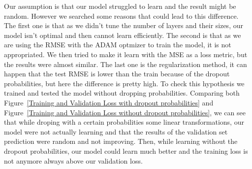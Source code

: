 \documentclass[12pt]{article}
\begin{document}
\noindent Our assumption is that our model struggled to learn and the result might be random. However we searched some reasons that could lead to this difference. 
The first one is that as we didn't tune the number of layers and their sizes, our model isn't optimal and then cannot learn efficiently. The second is that as we are using the RMSE with the ADAM optmizer to train the model, it is not appropriated. We then tried to make it learn with the MSE as a loss metric, but the results were almost similar. 
The last one is the regularization method, it can happen that the test RMSE is lower than the train because of the dropout probabilities, but here the difference is pretty high.
To check this hypothesis we trained and tested the model without dropping probabilities. 
Comparing both Figure~\ref{Training and Validation Loss with dropout probabilities} and Figure~\ref{Training and Validation Loss without dropout probabilities}, we can see that while droping with a certain probabilities some linear transformations, our model were not actually learning and that the results of the validation set prediction were random and not improving. Then, while learning without the dropout probabilities, our model could learn much better and the training loss is not anymore always above our validation loss.
\FloatBarrier
\end{document}
